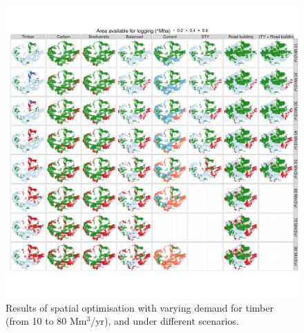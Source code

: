 \documentclass{article}
\begin{document}
\clearpage

\begin{figure}
    \centering
    \includegraphics[width=\linewidth]{graphs/mapsChangeDemand.pdf}
    \caption{Results of spatial optimisation with varying demand for timber (from 10 to 80 Mm$^3$/yr), and under different scenarios.}
    \label{fig:mapsIncDemand}
\end{figure}
\end{document}
